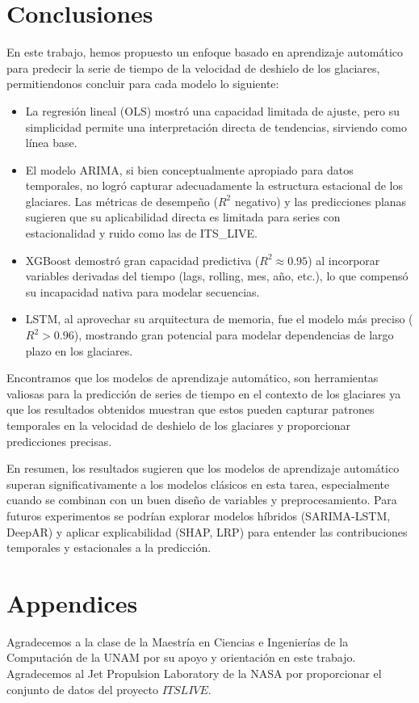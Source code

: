 \documentclass[sigconf,authordraft,language=spanish]{acmart}
\begin{document}
\section{Conclusiones}

En este trabajo, hemos propuesto un enfoque basado en aprendizaje automático para predecir la serie de tiempo de la velocidad de deshielo de los glaciares, permitiendonos concluir para
cada modelo lo siguiente:
\begin{itemize}
  \item La regresión lineal (OLS) mostró una capacidad limitada de ajuste, pero su simplicidad permite una interpretación directa de tendencias, sirviendo como línea base.
  \item El modelo ARIMA, si bien conceptualmente apropiado para datos temporales, no logró capturar adecuadamente la estructura estacional de los glaciares. Las métricas de 
desempeño ($R^2$ negativo) y las predicciones planas sugieren que su aplicabilidad directa es limitada para series con estacionalidad y ruido como las de ITS\_LIVE.
  \item XGBoost demostró gran capacidad predictiva ($R^2 \approx 0.95$) al incorporar variables derivadas del tiempo (lags, rolling, mes, año, etc.), lo que compensó su incapacidad nativa para modelar secuencias.
  \item LSTM, al aprovechar su arquitectura de memoria, fue el modelo más preciso ($R^{2} > 0.96$), mostrando gran potencial para modelar dependencias de largo plazo en los glaciares.

  \end{itemize}
Encontramos que los modelos de aprendizaje automático, son herramientas valiosas para la predicción de series de tiempo en el contexto de los glaciares ya que los resultados obtenidos muestran que estos  
pueden capturar patrones temporales en la velocidad de deshielo de los glaciares y proporcionar predicciones precisas.

En resumen, los resultados sugieren que los modelos de aprendizaje automático superan significativamente a los modelos clásicos en esta tarea, especialmente cuando se combinan con un buen diseño de variables y preprocesamiento. 
Para futuros experimentos  se podrían explorar modelos híbridos (SARIMA-LSTM, DeepAR) y aplicar explicabilidad (SHAP, LRP) para entender las contribuciones temporales y estacionales a la predicción.

\section{Appendices}
\begin{acks}
Agradecemos a la clase de la Maestría en Ciencias e Ingenierías de la Computación de la UNAM por su apoyo y orientación en este trabajo.
Agradecemos al Jet Propulsion Laboratory de la NASA por proporcionar el conjunto de datos del proyecto $ITSLIVE$.
\end{acks}




\appendix
\end{document}
